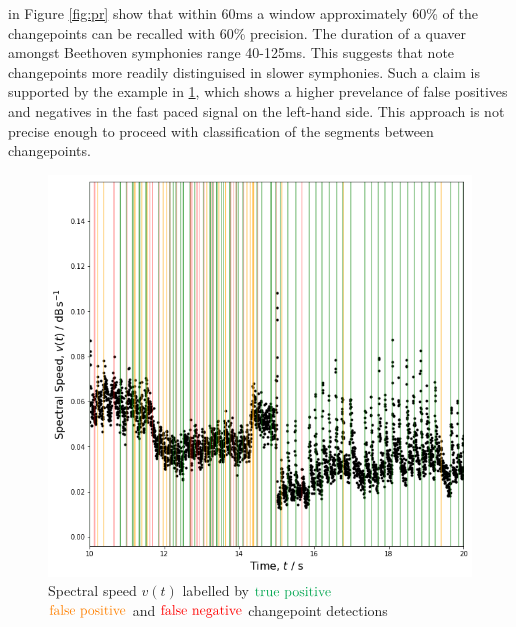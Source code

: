 \documentclass{article}[12pt]
\numberwithin{equation}{section}
\begin{document}
in Figure \ref{fig:pr} show that within 60ms a window approximately 60\% of the changepoints can be recalled with 60\% precision.
The duration of a quaver amongst Beethoven symphonies range 40-125ms. This suggests
that note changepoints more readily distinguised in slower symphonies. Such a claim
is supported by the example in \ref{fig:speed}, which shows a higher prevelance of
false positives and negatives in the fast paced signal on the left-hand side.
This approach is not precise enough to proceed with classification of the
segments between changepoints.
\begin{figure}[H]
\centering{}
\captionsetup{justification=centering}
\includegraphics[scale=0.42]{detections}
\caption{
Spectral speed $v(t)$ labelled by $\color{Green}{\text{true positive}}$\\ $\color{orange}{\text{false positive}}$
and $\color{red}{\text{false negative}}$ changepoint detections
}
\label{fig:speed}
\end{figure}
\end{document}
